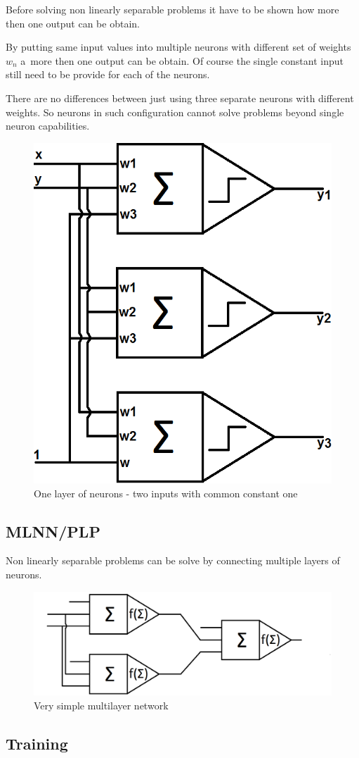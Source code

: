 Before solving non linearly separable problems it have to be shown how more then one output can be obtain.

By putting same input values into multiple neurons with different set of weights $w_n$ a~more then one output can be obtain. Of course the single constant input still need to be provide for each of the neurons.

There are no differences between just using three separate neurons with different weights. So neurons in such configuration cannot solve problems beyond single neuron capabilities.

\begin{figure}[!h]
    \centering
    \includegraphics[scale=0.27]{Media/Layer.png}
    \caption[One layer of neurons]{One layer of neurons - two inputs with common constant one}
    \label{fig:OneNeuronsLayer}
\end{figure}

\newpage

\subsection{MLNN/PLP}

Non linearly separable problems can be solve by connecting multiple layers of neurons.

\begin{figure}[!h]
    \centering
    \includegraphics[scale=0.2]{Media/MLN.png}
    \caption[Multilayer network]{Very simple multilayer network}
    \label{fig:MLN}
\end{figure}

\subsection{Training}